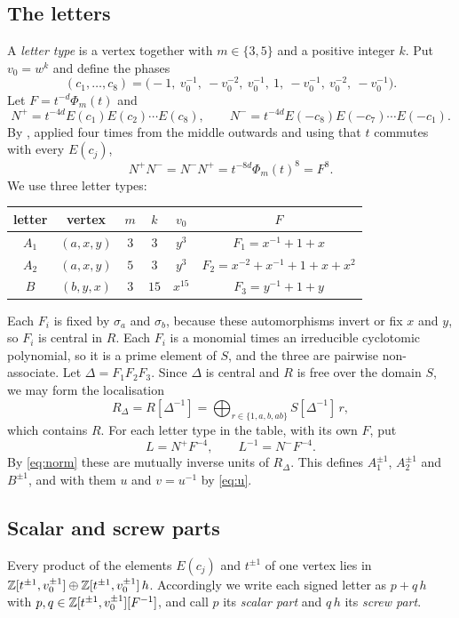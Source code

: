 \documentclass[11pt,colorlinks]{charlie}
\begin{document}
\subsection{The letters}
A \emph{letter type} is a vertex together with $m\in\{3,5\}$ and a positive integer $k$. Put $v_0=w^k$ and define the phases
\[
  (c_1,\dots,c_8)=\bigl(-1,\ v_0^{-1},\ -v_0^{-2},\ v_0^{-1},\ 1,\ -v_0^{-1},\ v_0^{-2},\ -v_0^{-1}\bigr).
\]
Let $F=t^{-d}\Phi_m(t)$ and
\[
  N^+=t^{-4d}E(c_1)E(c_2)\cdots E(c_8),\qquad N^-=t^{-4d}E(-c_8)E(-c_7)\cdots E(-c_1).
\]
By , applied four times from the middle outwards and using that $t$ commutes with every $E(c_j)$,
\begin{equation}\label{eq:norm}
  N^+N^-=N^-N^+=t^{-8d}\Phi_m(t)^8=F^8.
\end{equation}
We use three letter types:
\begin{center}
\begin{tabular}{@{}cccccc@{}}
\toprule
letter & vertex & $m$ & $k$ & $v_0$ & $F$ \\
\midrule
$A_1$ & $(a,x,y)$ & $3$ & $3$ & $y^3$ & $F_1=x^{-1}+1+x$ \\
$A_2$ & $(a,x,y)$ & $5$ & $3$ & $y^3$ & $F_2=x^{-2}+x^{-1}+1+x+x^2$ \\
$B$ & $(b,y,x)$ & $3$ & $15$ & $x^{15}$ & $F_3=y^{-1}+1+y$ \\
\bottomrule
\end{tabular}
\end{center}
Each $F_i$ is fixed by $\sigma_a$ and $\sigma_b$, because these automorphisms invert or fix $x$ and $y$, so $F_i$ is central in $R$. Each $F_i$ is a monomial times an irreducible cyclotomic polynomial, so it is a prime element of $S$, and the three are pairwise non-associate. Let $\Delta=F_1F_2F_3$. Since $\Delta$ is central and $R$ is free over the domain $S$, we may form the localisation
\[
  R_\Delta=R[\Delta^{-1}]=\bigoplus_{r\in\{1,a,b,ab\}}S[\Delta^{-1}]\,r,
\]
which contains $R$. For each letter type in the table, with its own $F$, put
\[
  L=N^+F^{-4},\qquad L^{-1}=N^-F^{-4}.
\]
By \eqref{eq:norm} these are mutually inverse units of $R_\Delta$. This defines $A_1^{\pm1}$, $A_2^{\pm1}$ and $B^{\pm1}$, and with them $u$ and $v=u^{-1}$ by \eqref{eq:u}.

\subsection{Scalar and screw parts}
Every product of the elements $E(c_j)$ and $t^{\pm1}$ of one vertex lies in $\mathbb{Z}[t^{\pm1},v_0^{\pm1}]\oplus\mathbb{Z}[t^{\pm1},v_0^{\pm1}]\,h$. Accordingly we write each signed letter as $p+q\,h$ with $p,q\in\mathbb{Z}[t^{\pm1},v_0^{\pm1}][F^{-1}]$, and call $p$ its \emph{scalar part} and $q\,h$ its \emph{screw part}.
\end{document}
